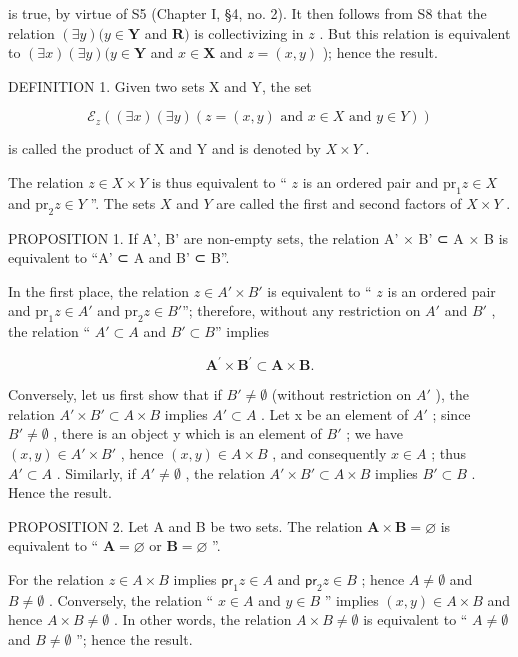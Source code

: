 is true, by virtue of S5 (Chapter I, §4, no. 2). It then follows from S8 that the relation \((\exists y)(y \in \mathbf{Y}\) and \(\mathbf{R})\) is collectivizing in \(z\) . But this relation is equivalent to \((\exists x)(\exists y)(y \in \mathbf{Y}\) and \(x \in \mathbf{X}\) and \(z = (x, y)\) ); hence the result.

DEFINITION 1. Given two sets X and Y, the set

\[
\mathcal {E} _ {z} ((\exists x) (\exists y) (z = (x, y) \text {   and   } x \in X \text {   and   } y \in Y))
\]

is called the product of X and Y and is denoted by \(X \times Y\) .

The relation \(z \in X \times Y\) is thus equivalent to `` \(z\) is an ordered pair and \(\text{pr}_1z \in X\) and \(\text{pr}_2z \in Y\) ''. The sets \(X\) and \(Y\) are called the first and second factors of \(X \times Y\) .

PROPOSITION 1. If A', B' are non-empty sets, the relation A' × B' ⊂ A × B is equivalent to ``A' ⊂ A and B' ⊂ B''.

In the first place, the relation \(z \in A' \times B'\) is equivalent to `` \(z\) is an ordered pair and \(\mathrm{pr}_1z \in A'\) and \(\mathrm{pr}_2z \in B'\)''; therefore, without any restriction on \(A'\) and \(B'\) , the relation `` \(A' \subset A\) and \(B' \subset B\)'' implies

\[
\mathbf {A} ^ {\prime} \times \mathbf {B} ^ {\prime} \subset \mathbf {A} \times \mathbf {B}.
\]

Conversely, let us first show that if \(B' \neq \emptyset\) (without restriction on \(A'\) ), the relation \(A' \times B' \subset A \times B\) implies \(A' \subset A\) . Let x be an element of \(A'\) ; since \(B' \neq \emptyset\) , there is an object y which is an element of \(B'\) ; we have \((x, y) \in A' \times B'\) , hence \((x, y) \in A \times B\) , and consequently \(x \in A\) ; thus \(A' \subset A\) . Similarly, if \(A' \neq \emptyset\) , the relation \(A' \times B' \subset A \times B\) implies \(B' \subset B\) . Hence the result.

PROPOSITION 2. Let A and B be two sets. The relation \(\mathbf{A} \times \mathbf{B} = \varnothing\) is equivalent to `` \(\mathbf{A} = \varnothing\) or \(\mathbf{B} = \varnothing\) ''.

For the relation \(z \in A \times B\) implies \(\mathsf{pr}_1z \in A\) and \(\mathsf{pr}_2z \in B\) ; hence \(A \neq \emptyset\) and \(B \neq \emptyset\) . Conversely, the relation `` \(x \in A\) and \(y \in B\) '' implies \((x, y) \in A \times B\) and hence \(A \times B \neq \emptyset\) . In other words, the relation \(A \times B \neq \emptyset\) is equivalent to `` \(A \neq \emptyset\) and \(B \neq \emptyset\) ''; hence the result.


